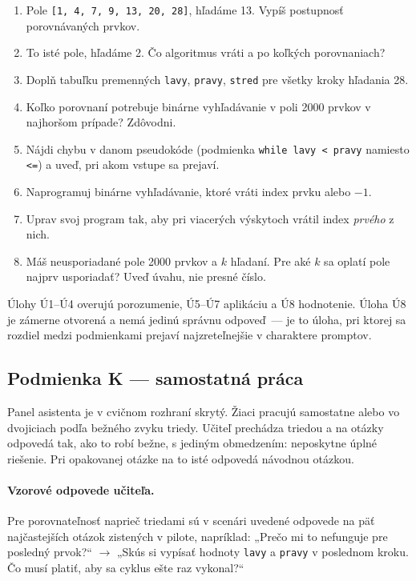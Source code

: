 \begin{enumerate}[nosep, label=Ú\arabic*.]
    \item Pole \texttt{[1, 4, 7, 9, 13, 20, 28]}, hľadáme 13. Vypíš postupnosť porovnávaných prvkov.
    \item To isté pole, hľadáme 2. Čo algoritmus vráti a po koľkých porovnaniach?
    \item Doplň tabuľku premenných \texttt{lavy}, \texttt{pravy}, \texttt{stred} pre všetky kroky hľadania 28.
    \item Koľko porovnaní potrebuje binárne vyhľadávanie v poli 2000 prvkov v najhoršom prípade? Zdôvodni.
    \item Nájdi chybu v danom pseudokóde (podmienka \texttt{while lavy < pravy} namiesto \texttt{<=}) a uveď, pri akom vstupe sa prejaví.
    \item Naprogramuj binárne vyhľadávanie, ktoré vráti index prvku alebo $-1$.
    \item Uprav svoj program tak, aby pri viacerých výskytoch vrátil index \emph{prvého} z nich.
    \item Máš neusporiadané pole 2000 prvkov a $k$ hľadaní. Pre aké $k$ sa oplatí pole najprv usporiadať? Uveď úvahu, nie presné číslo.
\end{enumerate}

Úlohy Ú1--Ú4 overujú porozumenie, Ú5--Ú7 aplikáciu a Ú8 hodnotenie. Úloha Ú8 je zámerne otvorená a nemá jedinú správnu odpoveď~--- je to úloha, pri ktorej sa rozdiel medzi podmienkami prejaví najzreteľnejšie v charaktere promptov.

\subsection{Podmienka K --- samostatná práca}

Panel asistenta je v cvičnom rozhraní skrytý. Žiaci pracujú samostatne alebo vo dvojiciach podľa bežného zvyku triedy. Učiteľ prechádza triedou a na otázky odpovedá tak, ako to robí bežne, s jediným obmedzením: neposkytne úplné riešenie. Pri opakovanej otázke na to isté odpovedá návodnou otázkou.

\paragraph{Vzorové odpovede učiteľa.} Pre porovnateľnosť naprieč triedami sú v scenári uvedené odpovede na päť najčastejších otázok zistených v pilote, napríklad: „Prečo mi to nefunguje pre posledný prvok?“ $\to$ „Skús si vypísať hodnoty \texttt{lavy} a \texttt{pravy} v poslednom kroku. Čo musí platiť, aby sa cyklus ešte raz vykonal?“

